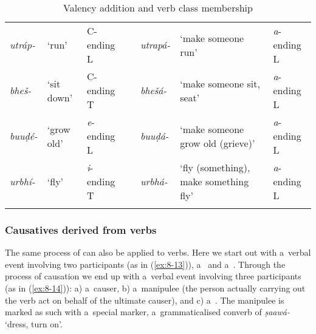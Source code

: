 \begin{table} 
\caption{Valency addition and {verb class} membership}
\begin{tabularx}{\textwidth}{ l  P{10mm}  l  l  l  Q  l }
\lsptoprule
\textit{utráp-} &
`run' &
C-ending L &
\centering {\textgreater} &
\textit{utrapá-} &
`make someone run' &
\textit{a}-ending L\\
\textit{bheš-} &
`sit down' &
C-ending T &
\centering {\textgreater} &
\textit{bhešá-} &
`make someone sit, seat' &
\textit{a}-ending L\\
\textit{buuḍé-} &
`grow old' &
\textit{e}-ending L &
\centering {\textgreater}\par
&
\textit{buuḍá-} &
`make someone grow old (grieve)' &
\textit{a}-ending L\\
\textit{urbhí-} &
`fly'
&
{\textit{i}-ending T}
&
\centering {\textgreater}\par
&
\textit{urbhá-}
&
`fly (something), make something fly' &
{\textit{a}-ending L}
\\\lspbottomrule
\end{tabularx}
\label{tab:8-addcl}
\end{table}

\subsubsection*{Causatives derived from  verbs}

The same process of  can also be applied to  verbs. Here we start out with a~verbal event involving two participants (as in (\ref{ex:8-13})), a~ and a~. Through the process of causation we end up with a~verbal event involving three participants (as in (\ref{ex:8-14})): a) a~causer, b) a~manipulee (the person actually carrying out the verb act on behalf of the ultimate causer), and c) a~. The manipulee is marked as such with a~special marker, a~grammaticalised converb of \textit{ṣaawá-} `dress, turn on'. 


